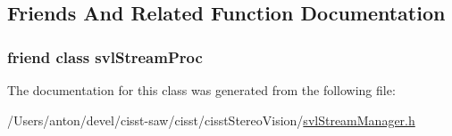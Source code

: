 \subsection{Friends And Related Function Documentation}
\hypertarget{classsvl_stream_manager_a6a9ee1dec5ca263793dca09411295245}{}
\subsubsection[{svl\+Stream\+Proc}]{\setlength{\rightskip}{0pt plus 5cm}friend class {\bf svl\+Stream\+Proc}\hspace{0.3cm}{\ttfamily [friend]}}\label{classsvl_stream_manager_a6a9ee1dec5ca263793dca09411295245}


The documentation for this class was generated from the following file\+:\begin{DoxyCompactItemize}
\item 
/\+Users/anton/devel/cisst-\/saw/cisst/cisst\+Stereo\+Vision/\hyperlink{svl_stream_manager_8h}{svl\+Stream\+Manager.\+h}\end{DoxyCompactItemize}
